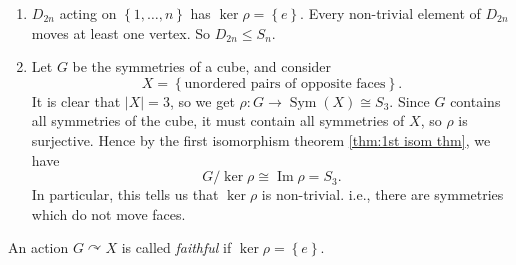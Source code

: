 \documentclass[10pt]{article}
\DeclareMathOperator{\im}{Im}
\def\le{\leqslant}
\DeclareMathOperator{\sym}{Sym}
\begin{document}
        \begin{example}
            \begin{enumerate}
                \item $ D_{2n} $ acting on $ \left\{ 1,\dots,n\right\} $ has $ \ker \rho=\left\{ e\right\} $. Every non-trivial element of $ D_{2n} $ moves at least one vertex. So $ D_{2n}\le S_n $.
                \item Let $G$ be the symmetries of a cube, and consider
                \[
                    X=\left\{ \text{unordered pairs of opposite faces}\right\}
                .\]
                It is clear that $ |X|=3 $, so we get $ \rho:G\to \sym(X) \cong S_3 $. Since $G$ contains all symmetries of the cube, it must contain all symmetries of $X$, so $\rho$ is surjective. Hence by the first isomorphism theorem \ref{thm:1st isom thm}, we have 
                \[
                    G/\ker \rho \cong \im \rho = S_3
                .\]
                In particular, this tells us that $ \ker \rho $ is non-trivial. i.e., there are symmetries which do not move faces.
            \end{enumerate}
        \end{example}
        \begin{definition}
            An action $ G \curvearrowright X $ is called \textit{faithful} if $ \ker \rho = \left\{ e\right\} $.
        \end{definition}
\end{document}
